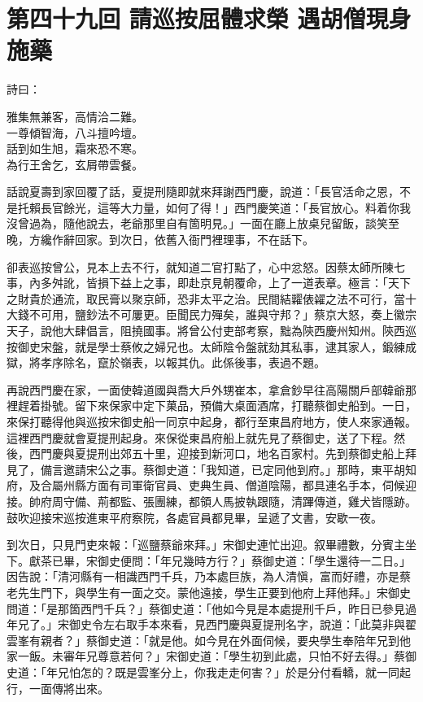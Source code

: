
\chapter*{第四十九回 請巡按屈體求榮 遇胡僧現身施藥}


詩曰：

\begin{myquote} 
雅集無兼客，高情洽二難。\\一尊傾智海，八斗擅吟壇。\\話到如生旭，霜來恐不寒。\\為行王舍乞，玄屑帶雲餐。
\end{myquote} 

話說夏壽到家回覆了話，夏提刑隨即就來拜謝西門慶，說道：「長官活命之恩，不是托賴長官餘光，這等大力量，如何了得！」西門慶笑道：「長官放心。料着你我沒曾過為，隨他說去，老爺那里自有箇明見。」一面在廳上放桌兒留飯，談笑至晚，方纔作辭回家。到次日，依舊入衙門裡理事，不在話下。

卻表巡按曾公，見本上去不行，就知道二官打點了，心中忿怒。因蔡太師所陳七事，內多舛訛，皆損下益上之事，即赴京見朝覆命，上了一道表章。極言：「天下之財貴於通流，取民膏以聚京師，恐非太平之治。民間結糶俵糴之法不可行，當十大錢不可用，鹽鈔法不可屢更。臣聞民力殫矣，誰與守邦？」蔡京大怒，奏上徽宗天子，說他大肆倡言，阻撓國事。將曾公付吏部考察，黜為陝西慶州知州。陝西巡按御史宋盤，就是學士蔡攸之婦兄也。太師陰令盤就劾其私事，逮其家人，鍛練成獄，將孝序除名，竄於嶺表，以報其仇。此係後事，表過不題。

再說西門慶在家，一面使韓道國與喬大戶外甥崔本，拿倉鈔早往高陽關戶部韓爺那裡趕着掛號。留下來保家中定下菓品，預備大桌面酒席，打聽蔡御史船到。一日，來保打聽得他與巡按宋御史船一同京中起身，都行至東昌府地方，使人來家通報。這裡西門慶就會夏提刑起身。來保從東昌府船上就先見了蔡御史，送了下程。然後，西門慶與夏提刑出郊五十里，迎接到新河口，地名百家村。先到蔡御史船上拜見了，備言邀請宋公之事。蔡御史道：「我知道，已定同他到府。」那時，東平胡知府，及合屬州縣方面有司軍衛官員、吏典生員、僧道陰陽，都具連名手本，伺候迎接。帥府周守備、荊都監、張團練，都領人馬披執跟隨，清蹕傳道，雞犬皆隱跡。鼓吹迎接宋巡按進東平府察院，各處官員都見畢，呈遞了文書，安歇一夜。

到次日，只見門吏來報：「巡鹽蔡爺來拜。」宋御史連忙出迎。叙畢禮數，分賓主坐下。獻茶已畢，宋御史便問：「年兄幾時方行？」蔡御史道：「學生還待一二日。」因告說：「清河縣有一相識西門千兵，乃本處巨族，為人清愼，富而好禮，亦是蔡老先生門下，與學生有一面之交。蒙他遠接，學生正要到他府上拜他拜。」宋御史問道：「是那箇西門千兵？」蔡御史道：「他如今見是本處提刑千戶，昨日已參見過年兄了。」宋御史令左右取手本來看，見西門慶與夏提刑名字，說道：「此莫非與翟雲峯有親者？」蔡御史道：「就是他。如今見在外面伺候，要央學生奉陪年兄到他家一飯。未審年兄尊意若何？」宋御史道：「學生初到此處，只怕不好去得。」蔡御史道：「年兄怕怎的？既是雲峯分上，你我走走何害？」{}於是分付看轎，就一同起行，一面傳將出來。

